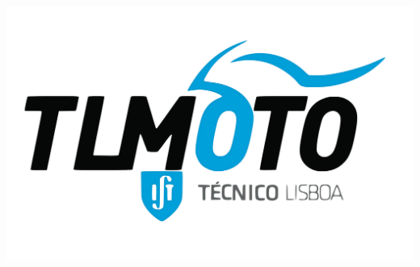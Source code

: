 \begin{titlepage}
\begin{center} \large
 
\end{center}
\vspace*{0.35cm}


    \includegraphics[scale=0.09]{imagens/tlmoto.png}\\[1cm]
   

\pagebreak
\end{titlepage}